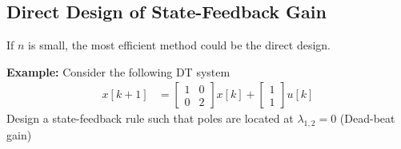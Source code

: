 \documentclass[twoside]{article}
\begin{document}
\subsection*{Direct Design of State-Feedback Gain}

If $n$ is small, the most efficient method could be the direct
design. 

\textbf{Example:} Consider the following DT system
%
\begin{align*}
 x[k+1] &= \left[ \begin{array}{cc} 1 & 0 \\ 0 & 2 \end{array} \right] x[k]
    + \left[ \begin{array}{c} 1 \\ 1 \end{array} \right] u[k]
\end{align*}
% 
Design a state-feedback rule such that poles are located at 
$\lambda_{1,2} = 0$ (Dead-beat gain)
\end{document}
